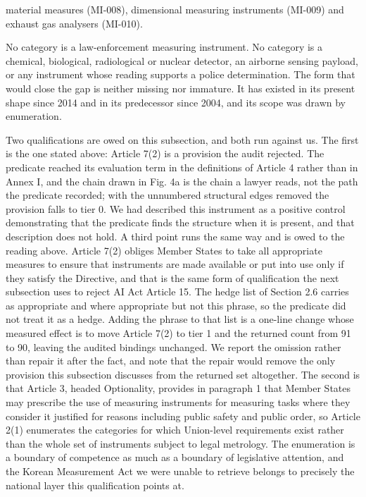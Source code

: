 material measures (MI-008), dimensional measuring instruments (MI-009) and exhaust gas analysers (MI-010).

No category is a law-enforcement measuring instrument. No category is a chemical, biological, radiological or nuclear detector, an airborne sensing payload, or any instrument whose reading supports a police determination. The form that would close the gap is neither missing nor immature. It has existed in its present shape since 2014 and in its predecessor since 2004, and its scope was drawn by enumeration.

Two qualifications are owed on this subsection, and both run against us. The first is the one stated above: Article 7(2) is a provision the audit rejected. The predicate reached its evaluation term in the definitions of Article 4 rather than in Annex I, and the chain drawn in Fig. 4a is the chain a lawyer reads, not the path the predicate recorded; with the unnumbered structural edges removed the provision falls to tier 0. We had described this instrument as a positive control demonstrating that the predicate finds the structure when it is present, and that description does not hold. A third point runs the same way and is owed to the reading above. Article 7(2) obliges Member States to take all appropriate measures to ensure that instruments are made available or put into use only if they satisfy the Directive, and that is the same form of qualification the next subsection uses to reject AI Act Article 15. The hedge list of Section 2.6 carries as appropriate and where appropriate but not this phrase, so the predicate did not treat it as a hedge. Adding the phrase to that list is a one-line change whose measured effect is to move Article 7(2) to tier 1 and the returned count from 91 to 90, leaving the audited bindings unchanged. We report the omission rather than repair it after the fact, and note that the repair would remove the only provision this subsection discusses from the returned set altogether. The second is that Article 3, headed Optionality, provides in paragraph 1 that Member States may prescribe the use of measuring instruments for measuring tasks where they consider it justified for reasons including public safety and public order, so Article 2(1) enumerates the categories for which Union-level requirements exist rather than the whole set of instruments subject to legal metrology. The enumeration is a boundary of competence as much as a boundary of legislative attention, and the Korean Measurement Act we were unable to retrieve belongs to precisely the national layer this qualification points at.

